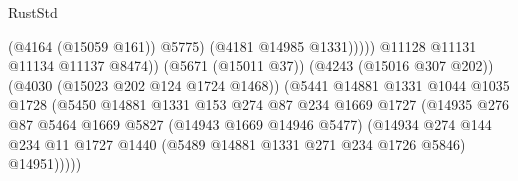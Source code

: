 \begin{lexlean}{RustStd}
\begin{coremodule}
                                                              (@4164 (@15059 @161))
                                                              @5775)
                                                            (@4181 @14985 @1331)))))
                                                    @11128
                                                    @11131
                                                    @11134
                                                    @11137
                                                    @8474))
                                                (@5671 (@15011 @37))
                                                (@4243 (@15016 @307 @202))
                                                (@4030 (@15023 @202 @124 @1724 @1468))
                                                (@5441
                                                  @14881
                                                  @1331
                                                  @1044
                                                  @1035
                                                  @1728
                                                  (@5450
                                                    @14881
                                                    @1331
                                                    @153
                                                    @274
                                                    @87
                                                    @234
                                                    @1669
                                                    @1727
                                                    (@14935
                                                      @276
                                                      @87
                                                      @5464
                                                      @1669
                                                      @5827
                                                      (@14943 @1669 @14946 @5477)
                                                      (@14934
                                                        @274
                                                        @144
                                                        @234
                                                        @11
                                                        @1727
                                                        @1440
                                                        (@5489 @14881 @1331 @271 @234 @1726 @5846)
                                                        @14951)))))

\end{coremodule}
\end{lexlean}
